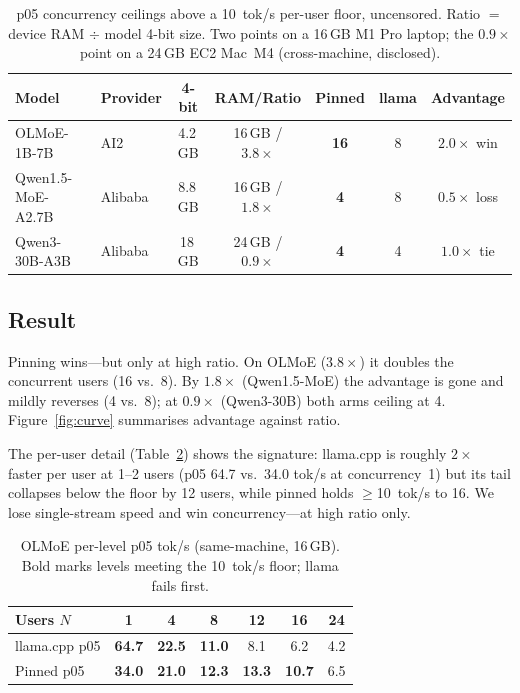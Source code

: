 \documentclass[11pt]{article}
\newcommand{\ppl}{\ensuremath{\times}}
\begin{document}
\begin{table}[t]
\centering
\caption{p05 concurrency ceilings above a \SI{10}{tok/s} per-user floor, uncensored.
Ratio $=$ device RAM $\div$ model 4-bit size. Two points on a 16\,GB M1 Pro laptop; the
$0.9\ppl$ point on a 24\,GB EC2 Mac~M4 (cross-machine, disclosed).}
\label{tab:crossover}
\small
\begin{tabular}{llccccc}
\toprule
Model & Provider & 4-bit & RAM/Ratio & Pinned & llama & Advantage \\
\midrule
OLMoE-1B-7B          & AI2     & 4.2\,GB & 16\,GB / $3.8\ppl$ & \textbf{16} & 8 & $\mathbf{2.0}\ppl$ win \\
Qwen1.5-MoE-A2.7B    & Alibaba & 8.8\,GB & 16\,GB / $1.8\ppl$ & \textbf{4}  & 8 & $\mathbf{0.5}\ppl$ loss \\
Qwen3-30B-A3B        & Alibaba & 18\,GB  & 24\,GB / $0.9\ppl$ & \textbf{4}  & 4 & $\mathbf{1.0}\ppl$ tie \\
\bottomrule
\end{tabular}
\end{table}

\subsection{Result}
Pinning wins---but only at high ratio. On OLMoE ($3.8\ppl$) it doubles the concurrent
users (16 vs.\ 8). By $1.8\ppl$ (Qwen1.5-MoE) the advantage is gone and mildly reverses
(4 vs.\ 8); at $0.9\ppl$ (Qwen3-30B) both arms ceiling at 4. Figure~\ref{fig:curve}
summarises advantage against ratio.

The per-user detail (Table~\ref{tab:olmoelevels}) shows the signature: llama.cpp is
roughly $2\ppl$ faster per user at 1--2 users (p05 64.7 vs.\ 34.0 tok/s at concurrency~1)
but its tail collapses below the floor by 12 users, while pinned holds $\ge$\SI{10}{tok/s}
to 16. We lose single-stream speed and win concurrency---at high ratio only.

\begin{table}[t]
\centering
\caption{OLMoE per-level p05 tok/s (same-machine, 16\,GB). Bold marks levels meeting the
\SI{10}{tok/s} floor; llama fails first.}
\label{tab:olmoelevels}
\small
\begin{tabular}{lcccccc}
\toprule
Users $N$          & 1      & 4      & 8      & 12     & 16     & 24 \\
\midrule
llama.cpp p05 & \textbf{64.7} & \textbf{22.5} & \textbf{11.0} & 8.1 & 6.2 & 4.2 \\
Pinned p05    & \textbf{34.0} & \textbf{21.0} & \textbf{12.3} & \textbf{13.3} & \textbf{10.7} & 6.5 \\
\bottomrule
\end{tabular}
\end{table}
\end{document}
